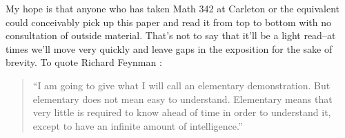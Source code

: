 My hope is that anyone who has taken Math 342 at Carleton or the equivalent could conceivably pick up this paper and read it from top to bottom with no consultation of outside material.
That's not to say that it'll be a light read--at times we'll move very quickly and leave gaps in the exposition for the sake of brevity. To quote Richard Feynman \cite[148]{feynmans-lost-lecture}:

\begin{quote}
    ``I am going to give what I will call an elementary demonstration. But elementary does not mean easy to understand. Elementary means that very little is required to know ahead of time in order to understand it, except to have an infinite amount of intelligence.''
\end{quote}

